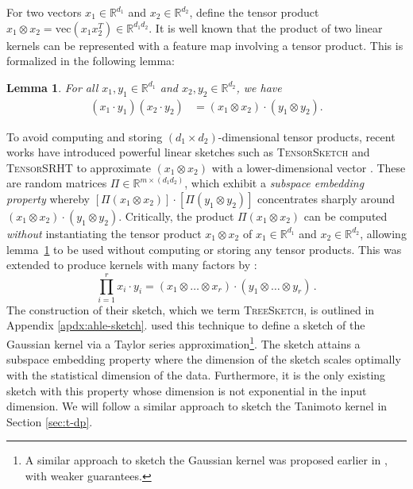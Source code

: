 \documentclass{article}
\theoremstyle{plain}
\newtheorem{lemma}[theorem]{Lemma}
\theoremstyle{definition}
\theoremstyle{remark}
\newcommand{\R}{\mathbb{R}}
\begin{document}
For two vectors $x_1\in\R^{d_1}$ and $x_2\in\R^{d_2}$, define the tensor product $x_1\otimes x_2 = \text{vec}(x_1x_2^T) \in \R^{d_1d_2}$.
It is well known that the product of two linear kernels can be represented with a feature map involving a tensor product. This is formalized in the following lemma:

\begin{lemma}\label{tensor product random feature lemma}
For all $x_1,y_1\in\R^{d_1}$ and $x_2,y_2\in\R^{d_2}$, we have
\begin{align}
(x_1\cdot y_1)(x_2\cdot y_2) 
&= (x_1\otimes x_2)\cdot(y_1\otimes y_2).
\end{align}
\end{lemma}
To avoid computing and storing $(d_1\times d_2)$-dimensional tensor products,
recent works have introduced powerful linear sketches such as \textsc{TensorSketch} and \textsc{TensorSRHT}
to approximate $(x_1\otimes x_2)$
with a lower-dimensional vector \citep{pagh2013compressed,pham2013fast, ahle2020oblivious}.
These are random matrices $\Pi\in \R^{m\times (d_1d_2)}$,
which exhibit a \emph{subspace embedding property} whereby $[\Pi(x_1\otimes x_2)]\cdot[\Pi(y_1\otimes y_2)]$ concentrates sharply around $(x_1\otimes x_2)\cdot(y_1\otimes y_2)$.
Critically, the product $\Pi(x_1\otimes x_2)$ can be computed \emph{without} instantiating the tensor product $x_1\otimes x_2$ of $x_1\in\R^{d_1}$ and $x_2\in\R^{d_2}$,
allowing lemma~\ref{tensor product random feature lemma} to be used without computing or storing any tensor products.
This was extended to produce kernels with many factors by 
\citet{ahle2020oblivious}:
\begin{equation}
\prod_{i=1}^r x_i\cdot y_i = (x_1\otimes \dots \otimes x_r)\cdot(y_1\otimes \dots\otimes y_r)\,.
\end{equation}
The construction of their sketch, which we term \textsc{TreeSketch}, is outlined in Appendix \ref{apdx:ahle-sketch}.
\citet{ahle2020oblivious} used this technique to define a sketch of the Gaussian kernel via a Taylor series approximation\footnote{A similar approach to sketch the Gaussian kernel was proposed earlier in \citet{cotter2011explicit}, with weaker guarantees.}.
The sketch attains a subspace embedding property where the dimension of the sketch scales optimally with the statistical dimension of the data. Furthermore, it is the only existing sketch with this property whose dimension is not exponential in the input dimension.
We will follow a similar approach to sketch the Tanimoto kernel in Section \ref{sec:t-dp}.%
\end{document}
